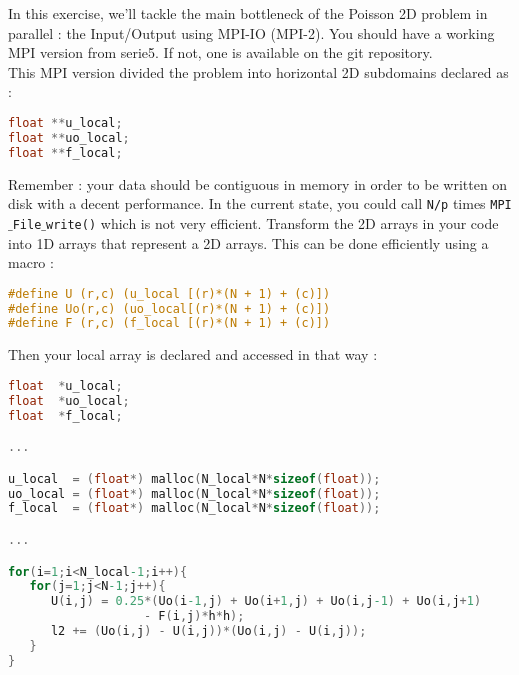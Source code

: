 \documentclass[11pt,a4paper]{article}
\begin{document}




\begin{exercise}


In this exercise, we'll tackle the main bottleneck of the Poisson 2D problem in parallel : the Input/Output using MPI-IO (MPI-2). You should have a working MPI version from serie5. If not, one is available on the git repository. 
\\

This MPI version divided the problem into horizontal 2D subdomains declared as :

\begin{lstlisting}[language=C,frame=lines]
float **u_local;
float **uo_local;
float **f_local;
\end{lstlisting}

Remember : your data should be contiguous in memory in order to be written on
disk with a decent performance. In the current state, you could call \texttt{N/p} times \texttt{MPI$\_$File$\_$write()} which is not very efficient. Transform the 2D arrays in your code into 1D arrays that represent a 2D arrays. This can be done efficiently using a macro :

\begin{lstlisting}[language=C,frame=lines]
#define U (r,c) (u_local [(r)*(N + 1) + (c)])
#define Uo(r,c) (uo_local[(r)*(N + 1) + (c)])
#define F (r,c) (f_local [(r)*(N + 1) + (c)])
\end{lstlisting}

Then your local array is declared and accessed in that way :

\begin{lstlisting}[language=C,frame=lines]
float  *u_local;
float  *uo_local;
float  *f_local;

...

u_local  = (float*) malloc(N_local*N*sizeof(float));
uo_local = (float*) malloc(N_local*N*sizeof(float));
f_local  = (float*) malloc(N_local*N*sizeof(float));

...

for(i=1;i<N_local-1;i++){
   for(j=1;j<N-1;j++){
      U(i,j) = 0.25*(Uo(i-1,j) + Uo(i+1,j) + Uo(i,j-1) + Uo(i,j+1)
                   - F(i,j)*h*h);
      l2 += (Uo(i,j) - U(i,j))*(Uo(i,j) - U(i,j));
   }
}
\end{lstlisting}


\end{exercise}
\end{document}
